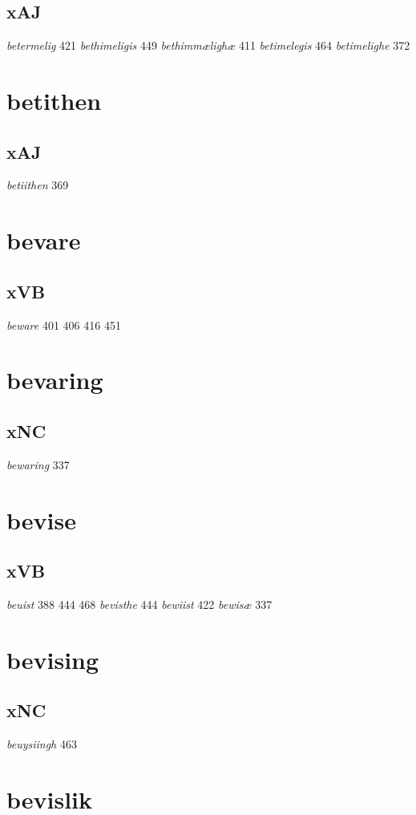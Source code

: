 \documentclass[a4paper,twocolumn]{article}
\begin{document}
\subsection{xAJ}
\label{sec:org1171446}
\emph{betermelig} 421 \emph{bethimeligis} 449 \emph{bethimmælighæ} 411 \emph{betimelegis} 464 \emph{betimelighe} 372 
\section{betithen}
\label{sec:orgbe63b6a}
\subsection{xAJ}
\label{sec:org4f1bb0f}
\emph{betiithen} 369 
\section{bevare}
\label{sec:org2a8c518}
\subsection{xVB}
\label{sec:org50e2d64}
\emph{beware} 401 406 416 451 
\section{bevaring}
\label{sec:org344069a}
\subsection{xNC}
\label{sec:org6638981}
\emph{bewaring} 337 
\section{bevise}
\label{sec:orga4b74dd}
\subsection{xVB}
\label{sec:org0894d7c}
\emph{beuist} 388 444 468 \emph{bevisthe} 444 \emph{bewiist} 422 \emph{bewisæ} 337 
\section{bevising}
\label{sec:orge7f4f49}
\subsection{xNC}
\label{sec:org34da29f}
\emph{beuysiingh} 463 
\section{bevislik}
\label{sec:orgc1f6f79}
\end{document}
